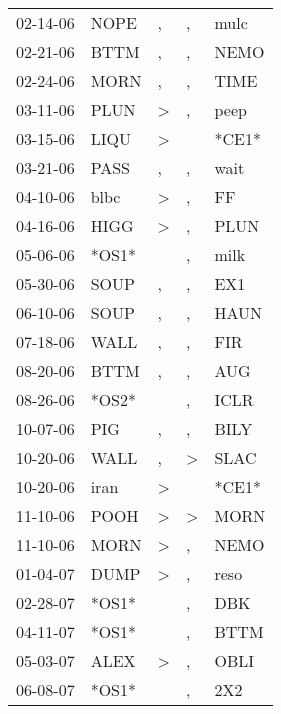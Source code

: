 \begin{supertabular}{lllll}
 02-14-06 &   NOPE &                , &                , &   mulc \\
 02-21-06 &   BTTM &                , &                , &   NEMO \\
 02-24-06 &   MORN &                , &                , &   TIME \\
 03-11-06 &   PLUN &     \textgreater &                , &   peep \\
 03-15-06 &   LIQU &     \textgreater &                  &  *CE1* \\
 03-21-06 &   PASS &                , &                , &   wait \\
 04-10-06 &   blbc &     \textgreater &                , &     FF \\
 04-16-06 &   HIGG &     \textgreater &                , &   PLUN \\
 05-06-06 &  *OS1* &                  &                , &   milk \\
 05-30-06 &   SOUP &                , &                , &    EX1 \\
 06-10-06 &   SOUP &                , &                , &   HAUN \\
 07-18-06 &   WALL &                , &                , &    FIR \\
 08-20-06 &   BTTM &                , &                , &    AUG \\
 08-26-06 &  *OS2* &                  &                , &   ICLR \\
 10-07-06 &    PIG &                , &                , &   BILY \\
 10-20-06 &   WALL &                , &     \textgreater &   SLAC \\
 10-20-06 &   iran &     \textgreater &                  &  *CE1* \\
 11-10-06 &   POOH &     \textgreater &     \textgreater &   MORN \\
 11-10-06 &   MORN &     \textgreater &                , &   NEMO \\
 01-04-07 &   DUMP &     \textgreater &                , &   reso \\
 02-28-07 &  *OS1* &                  &                , &    DBK \\
 04-11-07 &  *OS1* &                  &                , &   BTTM \\
 05-03-07 &   ALEX &     \textgreater &                , &   OBLI \\
 06-08-07 &  *OS1* &                  &                , &    2X2 \\

\end{supertabular}
